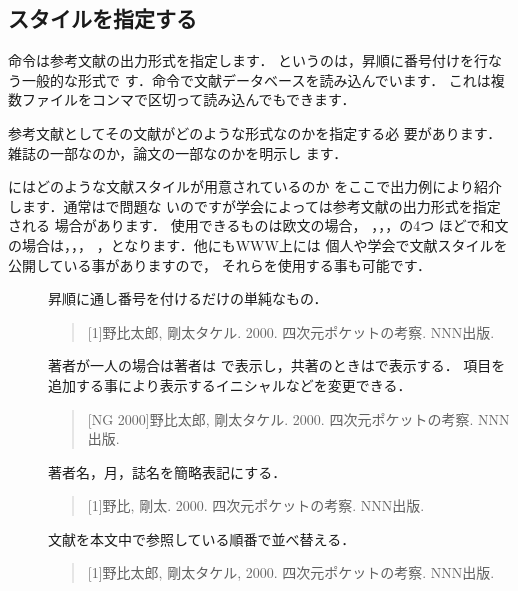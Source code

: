 \subsection{スタイルを指定する}
\begin{usage}


\end{usage}
命令は参考文献の出力形式を指定します．
というのは，昇順に番号付けを行なう一般的な形式で
す．命令で文献データベースを読み込んでいます．
これは複数ファイルをコンマで区切って読み込んでもできます．

参考文献としてその文献がどのような形式なのかを指定する必
要があります．雑誌の一部なのか，論文の一部なのかを明示し
ます．

%

{\BibTeX}にはどのような文献スタイルが用意されているのか
をここで出力例により紹介します．通常はで問題な
いのですが学会によっては参考文献の出力形式を指定される
場合があります．%
使用できるものは欧文の場合，
，，，の4つ
ほどで和文の場合は，，，
，となります．他にもWWW上には
個人や学会で文献スタイルを公開している事がありますので，
それらを使用する事も可能です． 
\begin{description}
\item[] 昇順に通し番号を付けるだけの単純なもの．
  \begin{quote}
  {[1]}野比太郎, 剛太タケル. 2000. 四次元ポケットの考察. NNN出版.
  \end{quote}
\item[] 著者が一人の場合は著者は
  で表示し，共著のときはで表示する．
   項目を追加する事により表示するイニシャルなどを変更できる．
  \begin{quote}
  {[NG 2000]}野比太郎, 剛太タケル. 2000. 四次元ポケットの考察. NNN出版. 
  \end{quote}
\item[] 著者名，月，誌名を簡略表記にする．
  \begin{quote}
  {[1]}野比, 剛太. 2000. 四次元ポケットの考察. NNN出版. 
  \end{quote}
\item[] 文献を本文中で参照している順番で並べ替える． 
  \begin{quote}
  {[1]}野比太郎, 剛太タケル, 2000. 四次元ポケットの考察. NNN出版.
  \end{quote}
\end{description}


